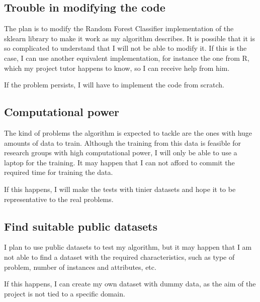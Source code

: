 \documentclass[a4paper]{article}
\begin{document}
    \subsection{Trouble in modifying the code}
    The plan is to modify the Random Forest Classifier implementation of the sklearn library to make it work as my algorithm describes. It is possible that it is so complicated to understand that I will not be able to modify it. If this is the case, I can use another equivalent implementation, for instance the one from R, which my project tutor happens to know, so I can receive help from him.

    If the problem persists, I will have to implement the code from scratch.

    \subsection{Computational power}

    The kind of problems the algorithm is expected to tackle are the ones with huge amounts of data to train. Although the training from this data is feasible for research groups with high computational power, I will only be able to use a laptop for the training. It may happen that I can not afford to commit the required time for training the data.

    If this happens, I will make the tests with tinier datasets and hope it to be representative to the real problems.


    \subsection{Find suitable public datasets}
    I plan to use public datasets to test my algorithm, but it may happen that I am not able to find a dataset with the required characteristics, such as type of problem, number of instances and attributes, etc.

    If this happens, I can create my own dataset with dummy data, as the aim of the project is not tied to a specific domain.
\end{document}
